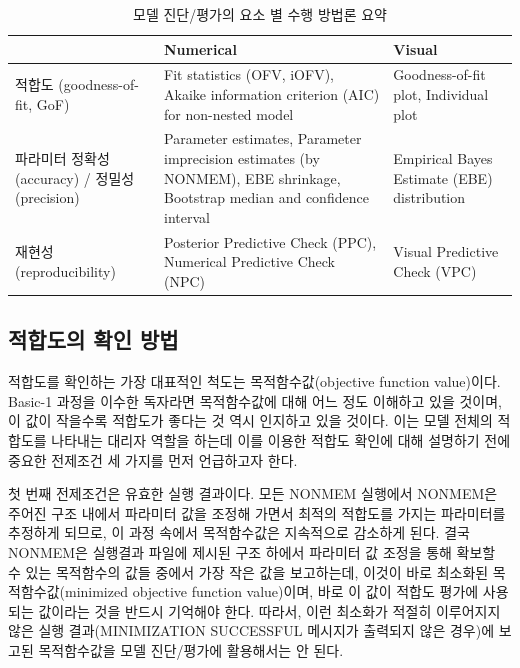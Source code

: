 \documentclass[
  10pt,
  krantz2,
  a4paper]{krantz}
\theoremstyle{definition}
\theoremstyle{definition}
\theoremstyle{definition}
\theoremstyle{remark}
\begin{document}
\begin{table}

\caption{\label{tab:eval-summary}모델 진단/평가의 요소 별 수행 방법론 요약}
\centering
\begin{tabular}[t]{>{\raggedright\arraybackslash}p{4cm}>{\raggedright\arraybackslash}p{4cm}>{\raggedright\arraybackslash}p{4cm}}
\toprule
  & Numerical & Visual\\
\midrule
적합도 (goodness-of-fit, GoF) & Fit statistics (OFV, iOFV), Akaike information criterion (AIC) for non-nested model & Goodness-of-fit plot, Individual plot\\
파라미터 정확성(accuracy) / 정밀성(precision) & Parameter estimates, Parameter imprecision estimates (by NONMEM), EBE shrinkage, Bootstrap median and confidence interval & Empirical Bayes Estimate (EBE) distribution\\
재현성(reproducibility) & Posterior Predictive Check (PPC), Numerical Predictive Check (NPC) & Visual Predictive Check (VPC)\\
\bottomrule
\end{tabular}
\end{table}


\hypertarget{uxc801uxd569uxb3c4uxc758-uxd655uxc778-uxbc29uxbc95}{%
\subsection{\texorpdfstring{적합도의 확인 방법}{적합도의 확인 방법}}\label{uxc801uxd569uxb3c4uxc758-uxd655uxc778-uxbc29uxbc95}}

적합도를 확인하는 가장 대표적인 척도는 목적함수값(objective function value)이다. Basic-1 과정을 이수한 독자라면 목적함수값에 대해 어느 정도 이해하고 있을 것이며, 이 값이 작을수록 적합도가 좋다는 것 역시 인지하고 있을 것이다. 이는 모델 전체의 적합도를 나타내는 대리자 역할을 하는데 이를 이용한 적합도 확인에 대해 설명하기 전에 중요한 전제조건 세 가지를 먼저 언급하고자 한다.

첫 번째 전제조건은 유효한 실행 결과이다. 모든 NONMEM 실행에서 NONMEM은 주어진 구조 내에서 파라미터 값을 조정해 가면서 최적의 적합도를 가지는 파라미터를 추정하게 되므로, 이 과정 속에서 목적함수값은 지속적으로 감소하게 된다. 결국 NONMEM은 실행결과 파일에 제시된 구조 하에서 파라미터 값 조정을 통해 확보할 수 있는 목적함수의 값들 중에서 가장 작은 값을 보고하는데, 이것이 바로 최소화된 목적함수값(minimized objective function value)이며, 바로 이 값이 적합도 평가에 사용되는 값이라는 것을 반드시 기억해야 한다. 따라서, 이런 최소화가 적절히 이루어지지 않은 실행 결과(MINIMIZATION SUCCESSFUL 메시지가 출력되지 않은 경우)에 보고된 목적함수값을 모델 진단/평가에 활용해서는 안 된다.
\end{document}
